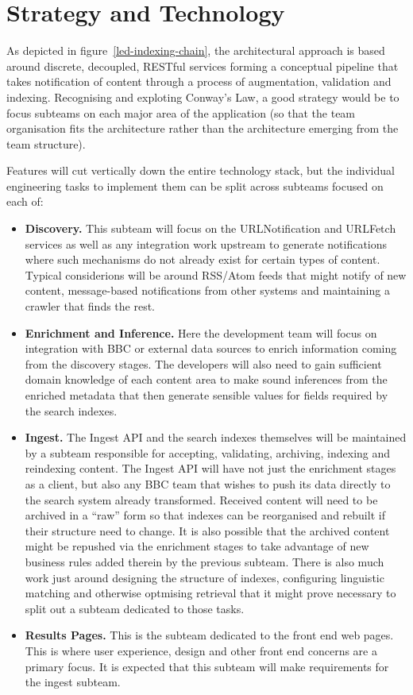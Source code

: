 \section{Strategy and Technology}

As depicted in figure~\ref{led-indexing-chain}, the architectural
approach is based around discrete, decoupled, RESTful services
forming a conceptual pipeline that takes notification of content
through a process of augmentation, validation and indexing. Recognising
and exploting Conway's Law\cite{conway1968committees}, a good strategy
would be to focus subteams on each major area of the application
(so that the team organisation fits the architecture rather than the
architecture emerging from the team structure).

Features will cut vertically down the entire technology stack, but
the individual engineering tasks to implement them can be split
across subteams focused on each of:

\begin{itemize}
  \item \textbf{Discovery.} This subteam will focus on the URLNotification
    and URLFetch services as well as any integration work upstream to
    generate notifications where such mechanisms do not already exist for certain
    types of content. Typical considerions will be around RSS/Atom feeds that
    might notify of new content, message-based notifications from other
    systems and maintaining a crawler that finds the rest.
  \item \textbf{Enrichment and Inference.} Here the development team will focus
    on integration with BBC or external data sources to enrich information
    coming from the discovery stages. The developers will also need
    to gain sufficient domain knowledge of each content area to make sound
    inferences from the enriched metadata that then generate sensible
    values for fields required by the search indexes.
  \item \textbf{Ingest.} The Ingest API and the search indexes themselves
    will be maintained by a subteam responsible for accepting, validating,
    archiving, indexing and reindexing content. The Ingest API will have
    not just the enrichment stages as a client, but also any BBC team that
    wishes to push its data directly to the search system already transformed.
    Received content will need to be archived in a ``raw'' form so that
    indexes can be reorganised and rebuilt if their structure need to change. It
    is also possible that the archived content might be repushed via the
    enrichment stages to take advantage of new business rules added therein by
    the previous subteam. There is also much work just around designing the
    structure of indexes, configuring linguistic matching and otherwise
    optmising retrieval that it might prove necessary to split out a subteam
    dedicated to those tasks.
  \item \textbf{Results Pages.} This is the subteam dedicated to the front
    end web pages. This is where user experience, design and other front
    end concerns are a primary focus. It is expected that this subteam
    will make requirements for the ingest subteam.
\end{itemize}

